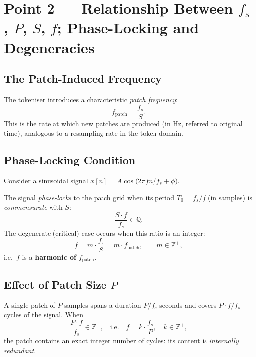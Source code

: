 \section{Point 2 — Relationship Between $f_s$, $P$, $S$, $f$; Phase-Locking and Degeneracies}


\subsection{The Patch-Induced Frequency}

The tokeniser introduces a characteristic \emph{patch frequency}:
\begin{equation}
    f_{\mathrm{patch}} = \frac{f_s}{S}.
\end{equation}
This is the rate at which new patches are produced (in Hz, referred to original time),
analogous to a resampling rate in the token domain.

\subsection{Phase-Locking Condition}

Consider a sinusoidal signal $x[n] = A\cos\!\bigl(2\pi f n / f_s + \phi\bigr)$.

\begin{definition}
    The signal \emph{phase-locks} to the patch grid when its period $T_0 = f_s/f$ (in
    samples) is \emph{commensurate} with $S$:
    \begin{equation}
        \frac{S \cdot f}{f_s} \in \mathbb{Q}.
    \end{equation}
    The degenerate (critical) case occurs when this ratio is an integer:
    \begin{equation}
        f = m \cdot \frac{f_s}{S} = m \cdot f_{\mathrm{patch}},
        \qquad m \in \mathbb{Z}^+,
    \end{equation}
    i.e.\ $f$ is a \textbf{harmonic of} $f_{\mathrm{patch}}$.
\end{definition}

\subsection{Effect of Patch Size $P$}

A single patch of $P$ samples spans a duration $P/f_s$ seconds and covers
$P \cdot f / f_s$ cycles of the signal.  When
\begin{equation}
    \frac{P \cdot f}{f_s} \in \mathbb{Z}^+,
    \quad \text{i.e.} \quad
    f = k \cdot \frac{f_s}{P}, \quad k \in \mathbb{Z}^+,
\end{equation}
the patch contains an exact integer number of cycles: its content is \emph{internally
redundant}.

